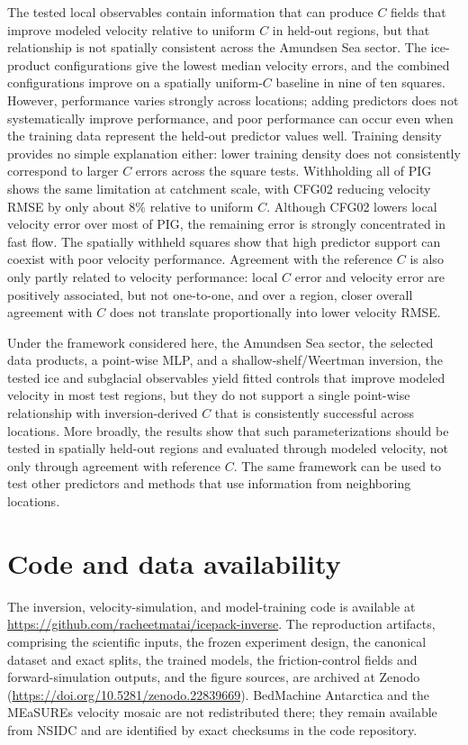 \documentclass[review,jog]{igs}
\begin{document}
The tested local observables contain information that can produce $C$ fields that improve modeled velocity relative to uniform $C$ in held-out regions, but that relationship is not spatially consistent across the Amundsen Sea sector. The ice-product configurations give the lowest median velocity errors, and the combined configurations improve on a spatially uniform-$C$ baseline in nine of ten squares. However, performance varies strongly across locations; adding predictors does not systematically improve performance, and poor performance can occur even when the training data represent the held-out predictor values well. Training density provides no simple explanation either: lower training density does not consistently correspond to larger $C$ errors across the square tests. Withholding all of PIG shows the same limitation at catchment scale, with CFG02 reducing velocity RMSE by only about 8\% relative to uniform $C$. Although CFG02 lowers local velocity error over most of PIG, the remaining error is strongly concentrated in fast flow. The spatially withheld squares show that high predictor support can coexist with poor velocity performance. Agreement with the reference $C$ is also only partly related to velocity performance: local $C$ error and velocity error are positively associated, but not one-to-one, and over a region, closer overall agreement with $C$ does not translate proportionally into lower velocity RMSE.

Under the framework considered here, the Amundsen Sea sector, the selected data products, a point-wise MLP, and a shallow-shelf/Weertman inversion, the tested ice and subglacial observables yield fitted controls that improve modeled velocity in most test regions, but they do not support a single point-wise relationship with inversion-derived $C$ that is consistently successful across locations. More broadly, the results show that such parameterizations should be tested in spatially held-out regions and evaluated through modeled velocity, not only through agreement with reference $C$. The same framework can be used to test other predictors and methods that use information from neighboring locations.


\section*{Code and data availability}
\begin{sloppypar}
The inversion, velocity-simulation, and model-training code is available at \url{https://github.com/racheetmatai/icepack-inverse}. The reproduction artifacts, comprising the scientific inputs, the frozen experiment design, the canonical dataset and exact splits, the trained models, the friction-control fields and forward-simulation outputs, and the figure sources, are archived at Zenodo (\url{https://doi.org/10.5281/zenodo.22839669}). BedMachine Antarctica and the MEaSUREs velocity mosaic are not redistributed there; they remain available from NSIDC and are identified by exact checksums in the code repository.
\end{sloppypar}
\end{document}
